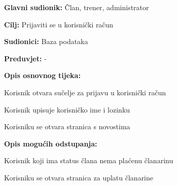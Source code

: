 						\noindent {}
					\begin{packed_item}
						
						\item \textbf{Glavni sudionik: } Član, trener, administrator
						\item  \textbf{Cilj: } Prijaviti se u korisnički račun
						\item  \textbf{Sudionici: } Baza podataka
						\item  \textbf{Preduvjet: } -
						\item  \textbf{Opis osnovnog tijeka:}
						
						\item[] \begin{packed_enum}
							
							\item Korisnik otvara sučelje za prijavu u korisnički račun
							\item Korisnik upisuje korisničko ime i lozinku
							\item Korisniku se otvara stranica s novostima
							
						\end{packed_enum}
						
						\item  \textbf{Opis mogućih odstupanja:}
						
						\item[] \begin{packed_item}
							
							\item[3.a] Korisnik koji ima status člana nema plaćenu članarinu
							\item[] \begin{packed_enum}
								
								\item Korisniku se otvara stranica za uplatu članarine
								
							\end{packed_enum}
							
						\end{packed_item}
					\end{packed_item}
				
